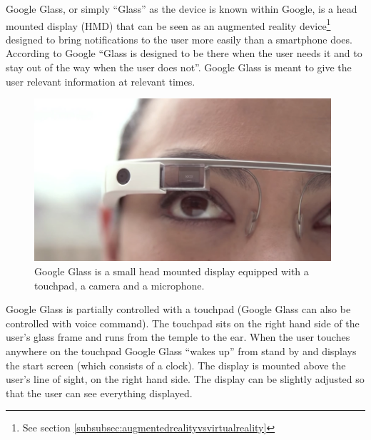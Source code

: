 Google Glass, or simply ``Glass'' as the device is known within Google, is a head mounted display (HMD) that can be seen as an augmented reality device\footnote{See section \ref{subsubsec:augmentedrealityvsvirtualreality}} designed to bring notifications to the user more easily than a smartphone does. According to Google ``Glass is designed to be there when the user needs it and to stay out of the way when the user does not''.\cite{glassDesignPrinciples} Google Glass is meant to give the user relevant information at relevant times.\\ 

	\begin{figure}[ht!]
		\centering
		\includegraphics[width=110mm]{images/GoogleGlassHardware}
		\caption{Google Glass is a small head mounted display equipped with a touchpad, a camera and a microphone.\cite{ImagesGoogleGlassUI}}
		\label{GoogleGlassUI}
	\end{figure}

Google Glass is partially controlled with a touchpad (Google Glass can also be controlled with voice command). The touchpad sits on the right hand side of the user's glass frame and runs from the temple to the ear. When the user touches anywhere on the touchpad Google Glass ``wakes up'' from stand by and displays the start screen (which consists of a clock). The display is mounted above the user's line of sight, on the right hand side. The display can be slightly adjusted so that the user can see everything displayed. \\








	
